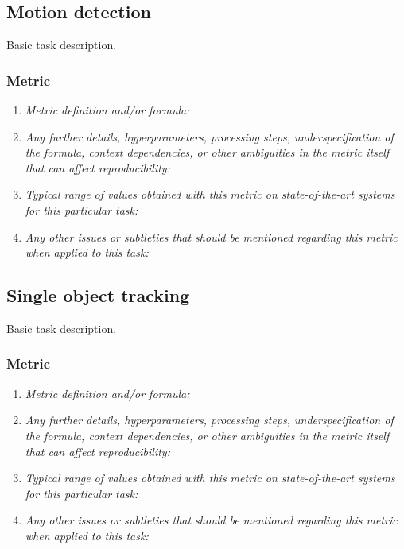 \documentclass[a4paper,11pt]{article}
\begin{document}
    \subsection{Motion detection}
        Basic task description.
        \subsubsection{Metric}
            \begin{enumerate}[label=\alph*.]
                \item \textit{Metric definition and/or formula:}
                \bigskip
                \item \textit{Any further details, hyperparameters, processing steps, underspecification of the formula, context dependencies, or other ambiguities in the metric itself that can affect reproducibility:}
                \bigskip
                \item \textit{Typical range of values obtained with this metric on state-of-the-art systems for this particular task:}
                \bigskip
                \item \textit{Any other issues or subtleties that should be mentioned regarding this metric when applied to this task:}
                \bigskip
            \end{enumerate}

    \subsection{Single object tracking}
        Basic task description.
        \subsubsection{Metric}
            \begin{enumerate}[label=\alph*.]
                \item \textit{Metric definition and/or formula:}
                \bigskip
                \item \textit{Any further details, hyperparameters, processing steps, underspecification of the formula, context dependencies, or other ambiguities in the metric itself that can affect reproducibility:}
                \bigskip
                \item \textit{Typical range of values obtained with this metric on state-of-the-art systems for this particular task:}
                \bigskip
                \item \textit{Any other issues or subtleties that should be mentioned regarding this metric when applied to this task:}
                \bigskip
            \end{enumerate}
\end{document}
